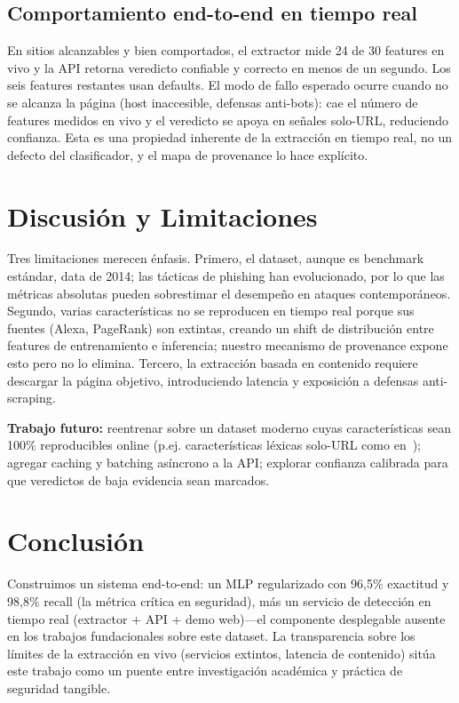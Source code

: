 \documentclass[conference]{IEEEtran}
\begin{document}
\subsection{Comportamiento end-to-end en tiempo real}
En sitios alcanzables y bien comportados, el extractor mide 24 de 30 features en vivo y la API retorna veredicto confiable y correcto en menos de un segundo. Los seis features restantes usan defaults. El modo de fallo esperado ocurre cuando no se alcanza la página (host inaccesible, defensas anti-bots): cae el número de features medidos en vivo y el veredicto se apoya en señales solo-URL, reduciendo confianza. Esta es una propiedad inherente de la extracción en tiempo real, no un defecto del clasificador, y el mapa de provenance lo hace explícito.

\section{Discusión y Limitaciones}
Tres limitaciones merecen énfasis. Primero, el dataset, aunque es benchmark estándar, data de 2014; las tácticas de phishing han evolucionado, por lo que las métricas absolutas pueden sobrestimar el desempeño en ataques contemporáneos. Segundo, varias características no se reproducen en tiempo real porque sus fuentes (Alexa, PageRank) son extintas, creando un shift de distribución entre features de entrenamiento e inferencia; nuestro mecanismo de provenance expone esto pero no lo elimina. Tercero, la extracción basada en contenido requiere descargar la página objetivo, introduciendo latencia y exposición a defensas anti-scraping.

\textbf{Trabajo futuro:} reentrenar sobre un dataset moderno cuyas características sean 100\% reproducibles online (p.ej. características léxicas solo-URL como en~\cite{sahingoz2019}); agregar caching y batching asíncrono a la API; explorar confianza calibrada para que veredictos de baja evidencia sean marcados.

\section{Conclusión}
Construimos un sistema end-to-end: un MLP regularizado con 96,5\% exactitud y 98,8\% recall (la métrica crítica en seguridad), más un servicio de detección en tiempo real (extractor + API + demo web)---el componente desplegable ausente en los trabajos fundacionales sobre este dataset. La transparencia sobre los límites de la extracción en vivo (servicios extintos, latencia de contenido) sitúa este trabajo como un puente entre investigación académica y práctica de seguridad tangible.
\end{document}
